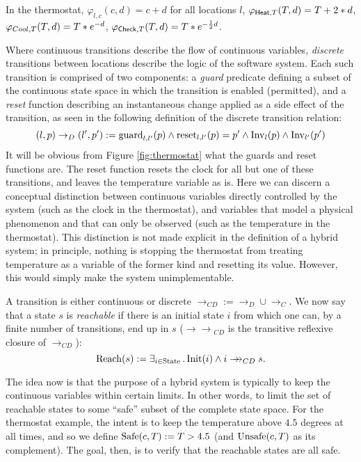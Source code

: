\documentclass[runningheads]{llncs}
\newcommand{\Exists}[2]{\exists_{#1} \, . \, #2}
\def\phi{\varphi}
\newcommand{\weg}[1]{}
\newcommand{\Heat}{{\sf Heat}}
\newcommand{\Cool}{{\sf Cool}}
\newcommand{\Chec}{{\sf Check}}
\newcommand{\State}{{\rm State}}
\newcommand{\Inv}{{\rm Inv}}
\newcommand{\Init}{{\rm Init}}
\newcommand{\Unsafe}{{\rm Unsafe}}
\newcommand{\Safe}{{\rm Safe}}
\newcommand{\Reach}{{\rm Reach}}
\newcommand{\guard}{{\rm guard}}
\newcommand{\reset}{{\rm reset}}
\newcommand{\trans}{\rightarrow_{CD}}
\newcommand{\doubleheadrightarrow}{\mathrel{\rightarrow\!\!\!\!\rightarrow}}
\newcommand{\ttrans}{\doubleheadrightarrow_{CD}}
\newcommand{\contrans}{\rightarrow_C}
\newcommand{\distrans}{\rightarrow_D}
\begin{document}
In the thermostat, $\phi_{l,c}(c,d) = c + d$ for all locations $l$, $\phi_{\Heat,T}(T,d)= T + 2 * d$,
$\phi_{\\Cool,T}(T,d)= T * e^{-d}$, $\phi_{\Chec,T}(T,d)= T * e^{- \frac{1}{2}d}$.

Where continuous transitions describe the flow of continuous
variables, \emph{discrete} transitions between locations describe the
logic of the software system. Each such transition is comprised of two
components: a \emph{guard} predicate defining a subset of the continuous state
space in which the transition is enabled (permitted), and a \emph{reset} function
describing an
instantaneous change applied as a side effect of the transition, as
seen in the following definition of the discrete transition relation:
$$ (l,p) \distrans (l',p') := \guard_{l,l'}(p) \wedge \reset_{l,l'}(p)= p' \wedge \Inv_l(p) \wedge \Inv_{l'}(p')$$
It will be obvious from Figure \ref{fig:thermostat} what the guards
and reset functions are. The reset function resets the clock for all
but one of these transitions, and leaves the temperature variable as
is. Here we can discern a conceptual distinction between continuous
variables directly controlled by the system (such as the clock in the
thermostat), and variables that model a physical phenomenon and that
can only be observed (such as the temperature in the thermostat). This
distinction is not made explicit in the definition of a hybrid system;
in principle, nothing is stopping the thermostat from treating
temperature as a variable of the former kind and resetting its
value. However, this would simply make the system unimplementable.


A transition is either continuous or discrete $\trans:= \distrans \cup \contrans$. We now say that a state $s$ is \emph{reachable} if there is an initial state $i$ from which one can, by a finite number of transitions, end up in $s$ ($\ttrans$ is the transitive reflexive closure of $\trans$):
$$\Reach(s):=
    \Exists{i\in \State}{\Init(i) \wedge i \ttrans s}.$$
\weg{As mentioned before, the set of reachable states represents the
possible behaviours exhibited by a hypothetical real-world
implementation of the hybrid system (as software running on a device
with sensors and actuators).
}

The idea now is that the purpose of a hybrid system is typically to
keep the continuous variables within certain limits. In other words,
to limit the set of reachable states to some ``safe'' subset of the
complete state space. For the thermostat example, the intent is to
keep the temperature above $4.5$ degrees at all times, and so we define $\Safe(c,T) := T > 4.5$ (and $\Unsafe(c,T)$ as its complement).
The goal, then, is to verify that the reachable states are all safe.
\end{document}
